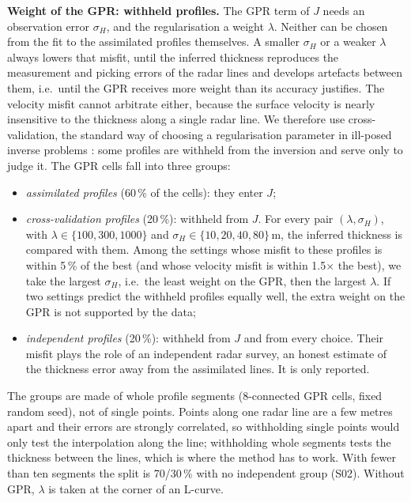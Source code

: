 \documentclass[10pt,a4paper]{article}
\begin{document}
\textbf{Weight of the GPR: withheld profiles.} The GPR term of $J$ needs an observation error $\sigma_H$, and the
regularisation a weight $\lambda$. Neither can be chosen from the fit to the assimilated profiles themselves. A
smaller $\sigma_H$ or a weaker $\lambda$ always lowers that misfit, until the inferred thickness reproduces the
measurement and picking errors of the radar lines and develops artefacts between them, i.e.\ until the GPR receives
more weight than its accuracy justifies. The velocity misfit cannot arbitrate either, because the surface velocity is
nearly insensitive to the thickness along a single radar line. We therefore use cross-validation, the standard way of
choosing a regularisation parameter in ill-posed inverse problems \citep{hansen}: some profiles are withheld from the
inversion and serve only to judge it. The GPR cells fall into three groups:
\begin{itemize}\setlength{\itemsep}{1pt}
\item \emph{assimilated profiles} (60\,\% of the cells): they enter $J$;
\item \emph{cross-validation profiles} (20\,\%): withheld from $J$. For every pair $(\lambda,\sigma_H)$, with $\lambda\in\{100,300,1000\}$ and
$\sigma_H\in\{10,20,40,80\}$\,m, the inferred thickness is compared with them.
Among the settings whose misfit to these profiles is within 5\,\% of the best (and whose velocity misfit is within
1.5$\times$ the best), we take the largest $\sigma_H$, i.e.\ the least weight on the GPR, then the largest
$\lambda$. If two settings predict the withheld profiles equally well, the extra weight on the GPR is not supported by
the data;
\item \emph{independent profiles} (20\,\%): withheld from $J$ and from every choice. Their misfit plays the role of an
independent radar survey, an honest estimate of the thickness error away from the assimilated lines. It is only
reported.
\end{itemize}
The groups are made of whole profile segments (8-connected GPR cells, fixed random seed), not of single points.
Points along one radar line are a few metres apart and their errors are strongly correlated, so withholding single
points would only test the interpolation along the line; withholding whole segments tests the thickness between
the lines, which is where the method has to work. With fewer than ten segments the split is 70/30\,\% with no
independent group (S02). Without GPR, $\lambda$ is taken at the corner of an L-curve.
\end{document}
